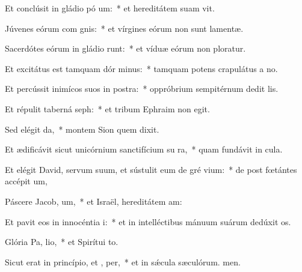 \item Et conclúsit in gládio pó um:~* et hereditátem suam vit.
\item Júvenes eórum com gnis:~* et vírgines eórum non sunt lamentæ.
\item Sacerdótes eórum in gládio runt:~* et víduæ eórum non ploratur.
\item Et excitátus est tamquam dór minus:~* tamquam potens crapulátus a no.
\item Et percússit inimícos suos in postra:~* oppróbrium sempitérnum dedit lis.
\item Et répulit taberná seph:~* et tribum Ephraim non egit.
\item Sed elégit  da,~* montem Sion quem dixit.
\item Et ædificávit sicut unicórnium sanctifícium su  ra,~* quam fundávit in cula.
\item Et elégit David, servum suum, et sústulit eum de gré vium:~* de post fœtántes accépit um,
\item Páscere Jacob,  um,~* et Israël, hereditátem am:
\item Et pavit eos in innocéntia  i:~* et in intelléctibus mánuum suárum dedúxit os.
\item Glória Pa,  lio,~* et Spirítui to.
\item Sicut erat in princípio, et ,  per,~* et in sǽcula sæculórum. men.
